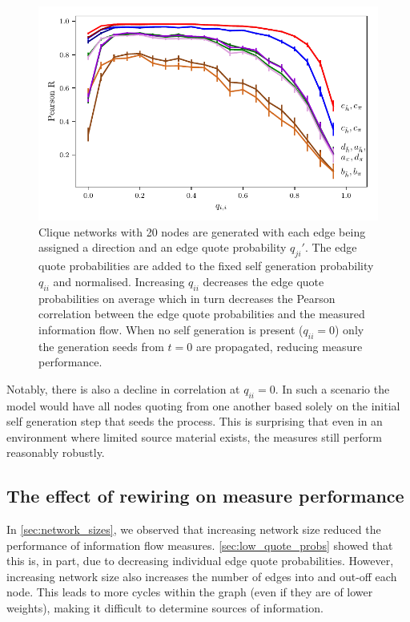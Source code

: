 \begin{figure}[!htbp]
	\centering
	\includegraphics{chapter3/figs/zipf_self_p.pdf}
	\caption{Clique networks with 20 nodes are generated with each edge being assigned a direction and an edge quote probability $q_{ji}'$. The edge quote probabilities are added to the fixed self generation probability $q_{ii}$ and normalised. Increasing $q_{ii}$ decreases the edge quote probabilities on average which in turn decreases the Pearson correlation between the edge quote probabilities and the measured information flow. When no self generation is present ($q_{ii}=0$) only the generation seeds from $t=0$ are propagated, reducing measure performance.}
	\label{fig:flow_self_p_vs_pearson_R}
\end{figure}

Notably, there is also a decline in correlation at $q_{ii}=0$. In such a scenario the model would have all nodes quoting from one another based solely on the initial self generation step that seeds the process. This is surprising that even in an environment where limited source material exists, the measures still perform reasonably robustly.

\subsection{The effect of rewiring on measure performance}
In \autoref{sec:network_sizes}, we observed that increasing network size reduced the performance of information flow measures. \autoref{sec:low_quote_probs} showed that this is, in part, due to decreasing individual edge quote probabilities. However, increasing network size also increases the number of edges into and out-off each node. This leads to more cycles within the graph (even if they are of lower weights), making it difficult to determine sources of information. 

